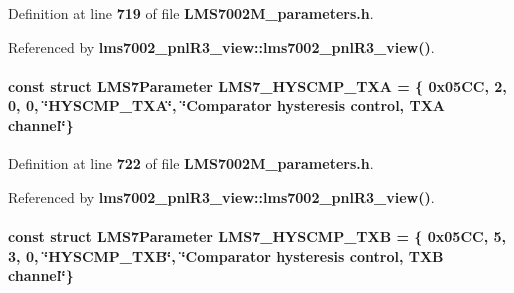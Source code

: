 Definition at line {\bf 719} of file {\bf L\+M\+S7002\+M\+\_\+parameters.\+h}.



Referenced by {\bf lms7002\+\_\+pnl\+R3\+\_\+view\+::lms7002\+\_\+pnl\+R3\+\_\+view()}.

\paragraph[{L\+M\+S7\+\_\+\+H\+Y\+S\+C\+M\+P\+\_\+\+T\+XA}]{\setlength{\rightskip}{0pt plus 5cm}const struct {\bf L\+M\+S7\+Parameter} L\+M\+S7\+\_\+\+H\+Y\+S\+C\+M\+P\+\_\+\+T\+XA = \{ 0x05\+C\+C, 2, 0, 0, \char`\"{}\+H\+Y\+S\+C\+M\+P\+\_\+\+T\+X\+A\char`\"{}, \char`\"{}\+Comparator hysteresis control, T\+X\+A channel\char`\"{}\}\hspace{0.3cm}{\ttfamily [static]}}\label{LMS7002M__parameters_8h_a2fbef98232289df3e74a4ae5ca1c475e}


Definition at line {\bf 722} of file {\bf L\+M\+S7002\+M\+\_\+parameters.\+h}.



Referenced by {\bf lms7002\+\_\+pnl\+R3\+\_\+view\+::lms7002\+\_\+pnl\+R3\+\_\+view()}.

\paragraph[{L\+M\+S7\+\_\+\+H\+Y\+S\+C\+M\+P\+\_\+\+T\+XB}]{\setlength{\rightskip}{0pt plus 5cm}const struct {\bf L\+M\+S7\+Parameter} L\+M\+S7\+\_\+\+H\+Y\+S\+C\+M\+P\+\_\+\+T\+XB = \{ 0x05\+C\+C, 5, 3, 0, \char`\"{}\+H\+Y\+S\+C\+M\+P\+\_\+\+T\+X\+B\char`\"{}, \char`\"{}\+Comparator hysteresis control, T\+X\+B channel\char`\"{}\}\hspace{0.3cm}{\ttfamily [static]}}\label{LMS7002M__parameters_8h_af1252edf5a06566df4137f33c0534cc7}


